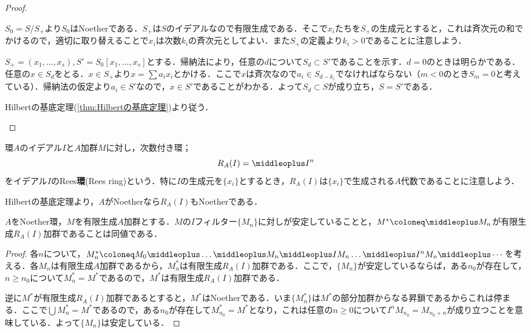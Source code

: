 \begin{proof}
	\begin{eqv}
		\item $S_0=S/S_+$より$S_0$はNoetherである．$S_+$は$S$のイデアルなので有限生成である．そこで$x_i$たちを$S_+$の生成元とすると，これは斉次元の和でかけるので，適切に取り替えることで$x_i$は次数$k_i$の斉次元としてよい．また$S_+$の定義より$k_i>0$であることに注意しよう．
		
		$S_+=(x_1,\dots,x_s), S'=S_0[x_1,\dots,x_s]$とする．帰納法により，任意の$d$について$S_d\subset S'$であることを示す．$d=0$のときは明らかである．任意の$x\in S_d$をとる．$x\in S_+$より$x=\sum a_ix_i$とかける．ここで$x$は斉次なので$a_i\in S_{d-k_i}$でなければならない（$m<0$のとき$S_m=0$と考えている）．帰納法の仮定より$a_i\in S'$なので，$x\in S'$であることがわかる．よって$S_d\subset S$が成り立ち，$S=S'$である．
		
		\item Hilbertの基底定理(\ref{thm:Hilbertの基底定理})より従う．
	\end{eqv}
\end{proof}

\begin{defi}[Rees環]
	環$A$のイデアル$I$と$A$加群$M$に対し，次数付き環；
	\[R_A(I)=\middleoplus I^n\]
	をイデアル$I$のRees\textbf{環}(Rees ring)という．特に$I$の生成元を$\{x_i\}$とするとき，$R_A(I)$は$\{x_i\}$で生成される$A$代数であることに注意しよう．
\end{defi}

Hilbertの基底定理より，$A$がNoetherなら$R_A(I)$もNoetherである．

\begin{lem}
	$A$をNoether環，$M$を有限生成$A$加群とする．$M$の$I$フィルター$\{M_n\}$に対しが安定していることと，$M^\ast\coloneq \middleoplus M_n$が有限生成$R_A(I)$加群であることは同値である．
\end{lem}

\begin{proof}
	各$n$について，$M_n^\ast\coloneq M_0\middleoplus\dots\middleoplus M_n\middleoplus IM_n\dots\middleoplus I^nM_n\middleoplus\cdots$を考える．各$M_n$は有限生成$A$加群であるから，$M_n^\ast$は有限生成$R_A(I)$加群である．ここで，$\{M_n\}$が安定しているならば，ある$n_0$が存在して，$n\geq n_0$について$M_n^\ast=M^\ast$であるので，$M^\ast$は有限生成$R_A(I)$加群である．
	
	逆に$M^\ast$が有限生成$R_A(I)$加群であるとすると，$M^\ast$はNoetherである．いま$\{M_n^\ast\}$は$M^\ast$の部分加群からなる昇鎖であるからこれは停まる．ここで$\bigcup M_n^\ast=M^\ast$であるので，ある$n_0$が存在して$M_{n_0}^\ast=M^\ast$となり，これは任意の$n\geq0$について$I^nM_{n_0}=M_{n_0+n}$が成り立つことを意味している．よって$\{M_n\}$は安定している．
\end{proof}

